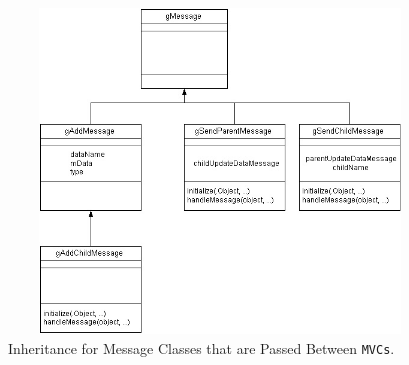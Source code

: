 \documentclass{article}[11pt]
\newcommand{\Rfunction}[1]{{\textsf{#1}}}
\newcommand{\Robject}[1]{{\texttt{#1}}}
\newcommand{\Rslot}[1]{\textsl{#1}}
\newcommand{\Rclass}[1]{\texttt{#1}}
\begin{document}
\begin{figure}[ht]
  \begin{center}
    \includegraphics[height=3.4in, width=4.5in]{newMessageClass2.jpg}
    \caption{ Inheritance for Message Classes that are Passed Between
      \Robject{MVCs}. }
    \label{Fig:BetwMess}
  \end{center}
\end{figure}

\end{document}
